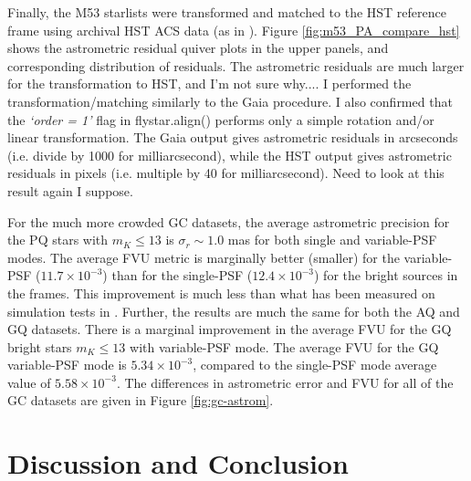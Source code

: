 \documentclass[]{spie}  %
\begin{document}
Finally, the M53 starlists were transformed and matched to the HST reference frame using archival HST ACS data (as in \cite{service:2016a}). Figure \ref{fig:m53_PA_compare_hst} shows the astrometric residual quiver plots in the upper panels, and corresponding distribution of residuals. The astrometric residuals are much larger for the transformation to HST, and I'm not sure why.... I performed the transformation/matching similarly to the Gaia procedure. I also confirmed that the \textit{`order = 1'} flag in flystar.align() performs only a simple rotation and/or linear transformation. The Gaia output gives astrometric residuals in arcseconds (i.e. divide by 1000 for milliarcsecond), while the HST output gives astrometric residuals in pixels (i.e. multiple by 40 for milliarcsecond). Need to look at this result again I suppose.


\indent For the much more crowded GC datasets, the average astrometric precision for the PQ stars with $m_{K} \leq 13$ is $\sigma_{{r}}{\sim}1.0$ mas for both single and variable-PSF modes. The average FVU metric is marginally better (smaller) for the variable-PSF ($11.7\times10^{-3}$) than for the single-PSF ($12.4\times10^{-3}$) for the bright sources in the frames. This improvement is much less than what has been measured on simulation tests in \cite{Turri:inprep}. Further, the results are much the same for both the AQ and GQ datasets. There is a marginal improvement in the average FVU for the GQ bright stars $m_{K} \leq 13$ with variable-PSF mode. The average FVU for the GQ variable-PSF mode is $5.34\times10^{-3}$, compared to the single-PSF mode average value of $5.58\times10^{-3}$. The differences in astrometric error and FVU for all of the GC datasets are given in Figure \ref{fig:gc-astrom}.

\clearpage
\section{Discussion and Conclusion} \label{sec:conclusion}
\end{document}

